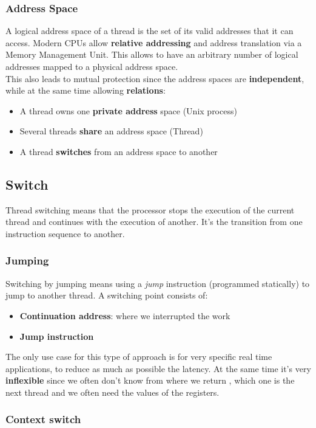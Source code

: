 \subsubsection{Address Space}
A logical address space of a thread is the set of its valid addresses that it can access. Modern CPUs allow \textbf{relative addressing} and address translation via a Memory Management Unit. This allows to have an arbitrary number of logical addresses mapped to a physical address space.\\
This also leads to mutual protection since the address spaces are \textbf{independent}, while at the same time allowing \textbf{relations}:
\begin{itemize}
	\item  A thread owns one \textbf{private address} space (Unix process)
	\item Several threads \textbf{share} an address space (Thread)
	\item A thread \textbf{switches} from an address space to another
\end{itemize}

\subsection{Switch}
Thread switching means that the processor stops the execution of the current thread and continues with the execution of another. It's the transition from one instruction sequence to another.
\subsubsection{Jumping}
Switching by jumping means using a \textit{jump} instruction (programmed statically) to jump to another thread. A switching point consists of:
\begin{itemize}
	\item \textbf{Continuation address}: where we interrupted the work
	\item \textbf{Jump instruction}
\end{itemize} 
The only use case for this type of approach is for very specific real time applications, to reduce as much as possible the latency. At the same time it's very \textbf{inflexible} since we often don't know from where we return , which one is the next thread and we often need the values of the registers.

\subsubsection{Context switch}
